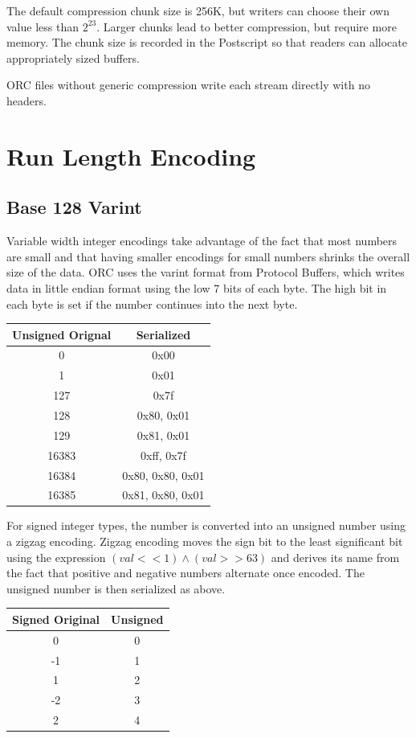 \documentclass{article}
\begin{document}
The default compression chunk size is 256K, but writers can choose
their own value less than $2^{23}$.  Larger chunks lead to better
compression, but require more memory.  The chunk size is recorded in
the Postscript so that readers can allocate appropriately sized
buffers.

ORC files without generic compression write each stream directly
with no headers.

\section{Run Length Encoding}

\subsection{Base 128 Varint}

Variable width integer encodings take advantage of the fact that most
numbers are small and that having smaller encodings for small numbers
shrinks the overall size of the data. ORC uses the varint format from
Protocol Buffers, which writes data in little endian format using the
low 7 bits of each byte. The high bit in each byte is set if the
number continues into the next byte.

\vspace{10pt}
\begin{tabular}{| c | c |}
\hline
Unsigned Orignal & Serialized \\
\hline
0 & 0x00 \\
1 & 0x01 \\
127 & 0x7f \\
128 & 0x80, 0x01 \\
129 & 0x81, 0x01 \\
16383 & 0xff, 0x7f \\
16384 & 0x80, 0x80, 0x01 \\
16385 & 0x81, 0x80, 0x01 \\
\hline
\end{tabular}
\vspace{10pt}

For signed integer types, the number is converted into an unsigned
number using a zigzag encoding.  Zigzag encoding moves the sign bit to
the least significant bit using the expression $(val << 1) \wedge (val
>> 63)$ and derives its name from the fact that positive and negative
numbers alternate once encoded. The unsigned number is then serialized
as above.

\vspace{10pt}
\begin{tabular}{| c | c |}
\hline
Signed Original & Unsigned\\
\hline
0 & 0 \\
-1 & 1 \\
1 & 2 \\
-2 & 3 \\
2 & 4 \\
\hline
\end{tabular}
\end{document}
